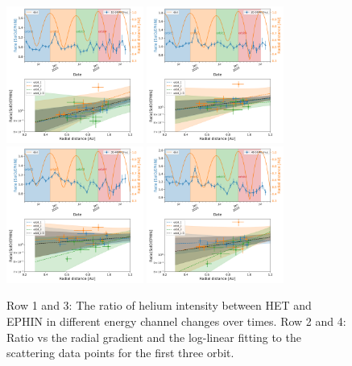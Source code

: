 \begin{figure}[!htb]
    \centering
    \includegraphics[width =0.4\textwidth]{images/ACR/seperate_mask_1-3/ratio_time_radialgradient_10-20MeV.png}
    \includegraphics[width =0.4\textwidth]{images/ACR/seperate_mask_1-3/ratio_time_radialgradient_20-30MeV.png}
    \includegraphics[width =0.4\textwidth]{images/ACR/seperate_mask_1-3/ratio_time_radialgradient_30-40MeV.png}
    \includegraphics[width =0.4\textwidth]{images/ACR/seperate_mask_1-3/ratio_time_radialgradient_40-50MeV.png}
    \caption[Ratio of helium intensity between \ac{HET} and \ac{EPHIN} and the radial grdient]{Row 1 and 3: The ratio of helium intensity between \ac{HET} and \ac{EPHIN} in different energy channel changes over times. Row 2 and 4: Ratio vs the radial gradient and the log-linear fitting to the scattering data points for the first three orbit.} 
    \label{fig:ratio_radialgradient}
\end{figure}

